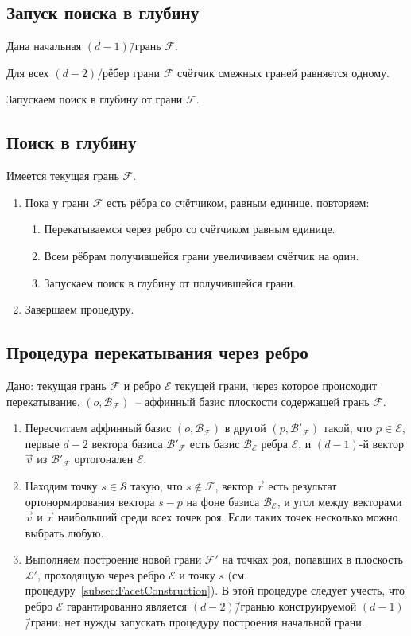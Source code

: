 \documentclass[a4paper,12pt]{article}
\newcommand{\Swarm}{\mathcal{S}}              %
\newcommand{\Facet}{\mathcal{F}}              %
\newcommand{\Edge}{\mathcal{E}}               %
\newcommand{\Basis}{\mathcal{B}}              %
\newcommand{\Plane}{\mathcal{L}}           %
\begin{document}
  \subsection{Запуск поиска в глубину}
    Дана начальная $(d-1)$\=/грань $\Facet$.

    Для всех $(d-2)$\-/рёбер грани $\Facet$ счётчик смежных граней равняется одному.

    Запускаем поиск в глубину от грани $\Facet$.
  \subsection{Поиск в глубину}

    Имеется текущая грань $\Facet$.
    \begin{enumerate}
      \item Пока у грани $\Facet$ есть рёбра со счётчиком, равным единице, повторяем:
      \begin{enumerate}
        \item Перекатываемся через ребро со счётчиком равным единице.
        \item Всем рёбрам получившейся грани увеличиваем счётчик на один.
        \item Запускаем поиск в глубину от получившейся грани.
      \end{enumerate}
      \item Завершаем процедуру.
    \end{enumerate}

  \subsection{Процедура перекатывания через ребро}
    Дано: текущая грань $\Facet$ и ребро $\Edge$ текущей грани, через которое происходит перекатывание, $(o, \Basis_{\Facet})$~-- аффинный базис плоскости содержащей грань $\Facet$.

    \begin{enumerate}
      \item Пересчитаем аффинный базис $(o, \Basis_{\Facet})$ в другой $(p, \Basis'_{\Facet})$ такой, что $p \in \Edge$, первые $d-2$ вектора базиса $\Basis'_{\Facet}$ есть базис $\Basis_{\Edge}$ ребра $\Edge$, и $(d-1)$-й вектор $\vec v$ из $\Basis'_{\Facet}$ ортогонален $\Edge$.
      \item Находим точку $s \in \Swarm$ такую, что $s \notin \Facet$, вектор $\vec r$ есть результат ортонормирования вектора $s - p$ на фоне базиса $\Basis_{\Edge}$, и угол между векторами $\vec v$ и $\vec r$ наибольший среди всех точек роя. Если таких точек несколько можно выбрать любую.
      \item Выполняем построение новой грани $\Facet'$ на точках роя, попавших в плоскость $\Plane'$, проходящую через ребро $\Edge$ и точку $s$ (см. процедуру~\ref{subsec:FacetConstruction}). В этой процедуре следует учесть, что ребро $\Edge$ гарантированно является $(d-2)$\=/гранью конструируемой $(d-1)$\=/грани: нет нужды запускать процедуру построения начальной грани.
    \end{enumerate}
\end{document}
